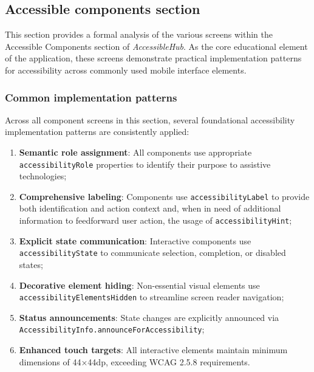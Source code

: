 \subsection{Accessible components section}
\label{subsec:accessible-components}

This section provides a formal analysis of the various screens within the Accessible Components section of \textit{AccessibleHub}. As the core educational element of the application, these screens demonstrate practical implementation patterns for accessibility across commonly used mobile interface elements. 

\subsubsection{Common implementation patterns}
\label{subsubsec:common-patterns}

Across all component screens in this section, several foundational accessibility implementation patterns are consistently applied:

\begin{enumerate}
    \item \textbf{Semantic role assignment}: All components use appropriate \texttt{accessibilityRole} properties to identify their purpose to assistive technologies;
    
    \item \textbf{Comprehensive labeling}: Components use \texttt{accessibilityLabel} to provide both identification and action context and, when in need of additional information to feedforward user action, the usage of \texttt{accessibilityHint};
    
    \item \textbf{Explicit state communication}: Interactive components use \texttt{accessibilityState} to communicate selection, completion, or disabled states;
    
    \item \textbf{Decorative element hiding}: Non-essential visual elements use \\\texttt{accessibilityElementsHidden} to streamline screen reader navigation;
    
    \item \textbf{Status announcements}: State changes are explicitly announced via \\\texttt{AccessibilityInfo.announceForAccessibility};
    
    \item \textbf{Enhanced touch targets}: All interactive elements maintain minimum dimensions of 44×44dp, exceeding WCAG 2.5.8 requirements.
\end{enumerate}

